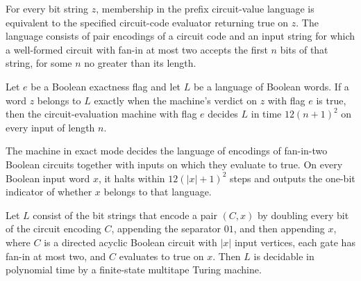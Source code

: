 \begin{theorem}
\label{BoolCircuit.mem_CVALPrefix_iff}
\leanok
{}
For every bit string $z$, membership in the prefix circuit-value language is equivalent
to the specified circuit-code evaluator returning true on $z$. The language consists of
pair encodings of a circuit code and an input string for which a well-formed circuit
with fan-in at most two accepts the first $n$ bits of that string, for some $n$ no
greater than its length.
\end{theorem}

\begin{theorem}
\label{BoolCircuit.CircuitEval.decidesInTime_of_verdict}
\leanok
{}
Let $e$ be a Boolean exactness flag and let $L$ be a language of Boolean words. If a
word $z$ belongs to $L$ exactly when the machine’s verdict on $z$ with flag $e$ is true,
then the circuit-evaluation machine with flag $e$ decides $L$ in time $12(n+1)^2$ on
every input of length $n$.
\end{theorem}

\begin{theorem}
\label{BoolCircuit.CircuitEval.evalTM_decidesInTime_CVAL}
\leanok
{}
The machine in exact mode decides the language of encodings of fan-in-two Boolean
circuits together with inputs on which they evaluate to true. On every Boolean input
word $x$, it halts within $12(|x|+1)^2$ steps and outputs the one-bit indicator of
whether $x$ belongs to that language.
\end{theorem}

\begin{theorem}
\label{BoolCircuit.CVAL_mem_P}
\leanok
{}
Let $L$ consist of the bit strings that encode a pair $(C,x)$ by doubling every bit of
the circuit encoding $C$, appending the separator $01$, and then appending $x$, where
$C$ is a directed acyclic Boolean circuit with $|x|$ input vertices, each gate has
fan-in at most two, and $C$ evaluates to true on $x$. Then $L$ is decidable in
polynomial time by a finite-state multitape Turing machine.
\end{theorem}

